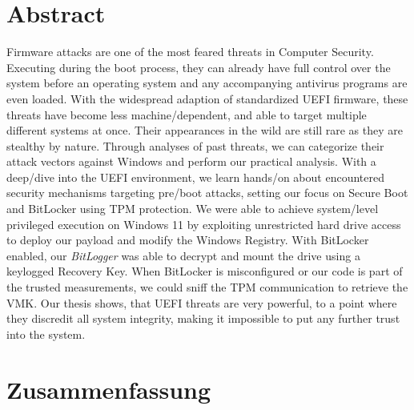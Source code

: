 

\chapter*{Abstract}
\label{sec:abstract}
\thispagestyle{empty}

Firmware attacks are one of the most feared threats in Computer Security.
Executing during the boot process, they can already have full control over the system before an operating system and any accompanying antivirus programs are even loaded.
With the widespread adaption of standardized \acf{UEFI} firmware, these threats have become less machine\-/dependent, and able to target multiple different systems at once.
Their appearances in the wild are still rare as they are stealthy by nature.
Through analyses of past threats, we can categorize their attack vectors against Windows and perform our practical analysis.
With a deep\-/dive into the \ac{UEFI} environment, we learn hands\-/on about encountered security mechanisms targeting pre\-/boot attacks, setting our focus on Secure Boot and BitLocker using \acf{TPM} protection.
We were able to achieve system\-/level privileged execution on Windows 11 by exploiting unrestricted hard drive access to deploy our payload and modify the Windows Registry.
With BitLocker enabled, our \emph{BitLogger} was able to decrypt and mount the drive using a keylogged Recovery Key.
When BitLocker is misconfigured or our code is part of the trusted measurements, we could sniff the \acs{TPM} communication to retrieve the \acs{VMK}.
Our thesis shows, that \acs{UEFI} threats are very powerful, to a point where they discredit all system integrity, making it impossible to put any further trust into the system.

\acresetall

\chapter*{Zusammenfassung}
\thispagestyle{empty}
\label{sec:zusammenfassung}

